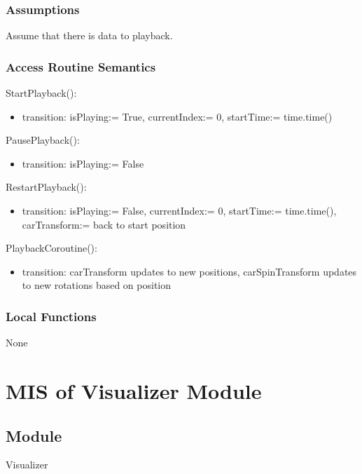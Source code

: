 \documentclass[12pt, titlepage]{article}
\begin{document}
\subsubsection{Assumptions}

Assume that there is data to playback.
\subsubsection{Access Routine Semantics}

\noindent StartPlayback():
\begin{itemize}
\item transition: isPlaying:= True, currentIndex:= 0, startTime:= time.time()
\end{itemize}

\noindent PausePlayback():
\begin{itemize}
\item transition: isPlaying:= False
\end{itemize}

\noindent RestartPlayback():
\begin{itemize}
\item transition: isPlaying:= False, currentIndex:= 0, startTime:= time.time(), carTransform:= back to start position
\end{itemize}

\noindent PlaybackCoroutine():
\begin{itemize}
\item transition: carTransform updates to new positions, carSpinTransform updates to new rotations based on position
\end{itemize}

\subsubsection{Local Functions}

None

\newpage

\section{MIS of Visualizer Module} \label{Module_visualizer} 

\subsection{Module}

Visualizer
\end{document}
